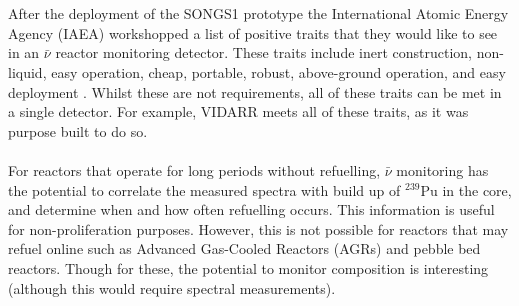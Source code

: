 \\\\After the deployment of the SONGS1 prototype the International Atomic Energy Agency (IAEA) workshopped a list of positive traits that they would like to see in an $\bar{\nu}$ reactor monitoring detector. These traits include inert construction, non-liquid, easy operation, cheap, portable, robust, above-ground operation, and easy deployment \cite{IAEA_2008}. Whilst these are not requirements, all of these traits can be met in a single detector. For example, VIDARR meets all of these traits, as it was purpose built to do so. 
\\\\For reactors that operate for long periods without refuelling, $\bar{\nu}$ monitoring has the potential to correlate the measured spectra with build up of $^{239}$Pu in the core, and determine when and how often refuelling occurs. This information is useful for non-proliferation purposes. However, this is not possible for reactors that may refuel online such as Advanced Gas-Cooled Reactors (AGRs) and pebble bed reactors. Though for these, the potential to monitor composition is interesting (although this would require spectral measurements).

